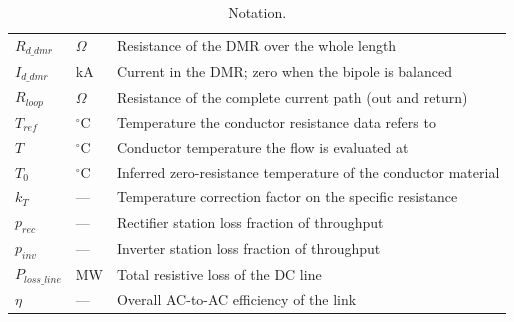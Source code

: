\begin{table}[!ht]
\begin{tabularx}{\linewidth}{@{}l l X@{}}
    $R_{d\_dmr}$    & $\Omega$      & Resistance of the DMR over the whole length \\
    $I_{d\_dmr}$    & kA            & Current in the DMR; zero when the bipole is balanced \\
    $R_{loop}$     & $\Omega$      & Resistance of the complete current path (out and return) \\
    $T_{ref}$      & $^{\circ}$C   & Temperature the conductor resistance data refers to \\
    $T$            & $^{\circ}$C   & Conductor temperature the flow is evaluated at \\
    $T_{0}$        & $^{\circ}$C   & Inferred zero-resistance temperature of the conductor material \\
    $k_{T}$        & ---           & Temperature correction factor on the specific resistance \\
    $p_{rec}$      & ---           & Rectifier station loss fraction of throughput \\
    $p_{inv}$      & ---           & Inverter station loss fraction of throughput \\
    $P_{loss\_line}$& MW            & Total resistive loss of the DC line \\
    $\eta$         & ---           & Overall AC-to-AC efficiency of the link \\
    \bottomrule
  \end{tabularx}
  \caption{Notation.}
  \label{tab:notation}
\end{table}

\pagebreak
